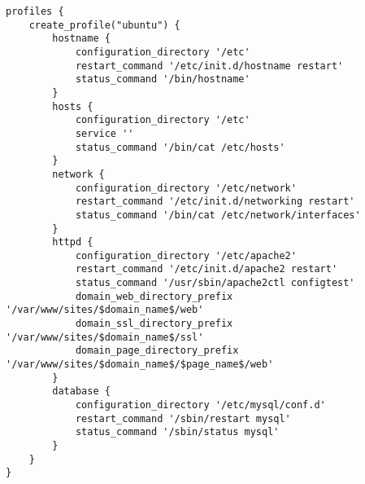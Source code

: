 \begin{lstlisting}[style=Java, caption=Beispiel Profil Ubuntu Server]
profiles {
    create_profile("ubuntu") {
        hostname {
            configuration_directory '/etc'
            restart_command '/etc/init.d/hostname restart'
            status_command '/bin/hostname'
        }
        hosts {
            configuration_directory '/etc'
            service ''
            status_command '/bin/cat /etc/hosts'
        }
        network {
            configuration_directory '/etc/network'
            restart_command '/etc/init.d/networking restart'
            status_command '/bin/cat /etc/network/interfaces'
        }
        httpd {
            configuration_directory '/etc/apache2'
            restart_command '/etc/init.d/apache2 restart'
            status_command '/usr/sbin/apache2ctl configtest'
            domain_web_directory_prefix '/var/www/sites/$domain_name$/web'
            domain_ssl_directory_prefix '/var/www/sites/$domain_name$/ssl'
            domain_page_directory_prefix '/var/www/sites/$domain_name$/$page_name$/web'
        }
        database {
            configuration_directory '/etc/mysql/conf.d'
            restart_command '/sbin/restart mysql'
            status_command '/sbin/status mysql'
        }
    }
}
\end{lstlisting}
